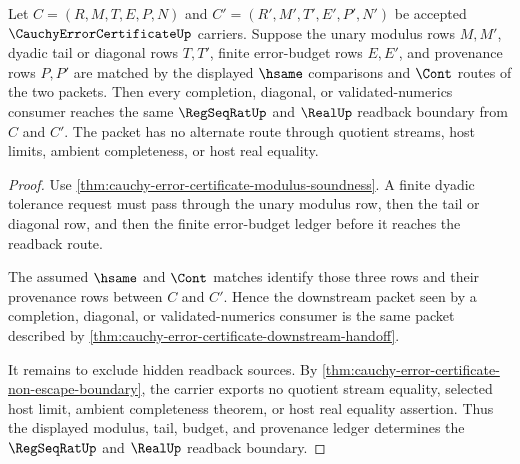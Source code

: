 \begin{theorem}
\label{thm:cauchy-error-certificate-budget-readback-determinacy}
Let $C=(R,M,T,E,P,N)$ and $C'=(R',M',T',E',P',N')$ be accepted $\CauchyErrorCertificateUp$ carriers. Suppose the unary modulus rows $M,M'$, dyadic tail or diagonal rows $T,T'$, finite error-budget rows $E,E'$, and provenance rows $P,P'$ are matched by the displayed $\hsame$ comparisons and $\Cont$ routes of the two packets. Then every completion, diagonal, or validated-numerics consumer reaches the same $\RegSeqRatUp$ and $\RealUp$ readback boundary from $C$ and $C'$. The packet has no alternate route through quotient streams, host limits, ambient completeness, or host real equality.
\end{theorem}
\begin{proof}
Use \autoref{thm:cauchy-error-certificate-modulus-soundness}. A finite dyadic tolerance request must pass through the unary modulus row, then the tail or diagonal row, and then the finite error-budget ledger before it reaches the readback route.

The assumed $\hsame$ and $\Cont$ matches identify those three rows and their provenance rows between $C$ and $C'$. Hence the downstream packet seen by a completion, diagonal, or validated-numerics consumer is the same packet described by \autoref{thm:cauchy-error-certificate-downstream-handoff}.

It remains to exclude hidden readback sources. By \autoref{thm:cauchy-error-certificate-non-escape-boundary}, the carrier exports no quotient stream equality, selected host limit, ambient completeness theorem, or host real equality assertion. Thus the displayed modulus, tail, budget, and provenance ledger determines the $\RegSeqRatUp$ and $\RealUp$ readback boundary.
\end{proof}

